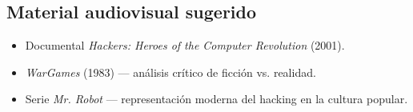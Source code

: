 \documentclass[11pt,a4paper]{article}
\begin{document}
\subsection{Material audiovisual sugerido}
\begin{itemize}[leftmargin=*]
  \item Documental \textit{Hackers: Heroes of the Computer Revolution} (2001).
  \item \textit{WarGames} (1983) --- análisis crítico de ficción vs. realidad.
  \item Serie \textit{Mr. Robot} --- representación moderna del hacking en la cultura popular.
\end{itemize}
\end{document}
